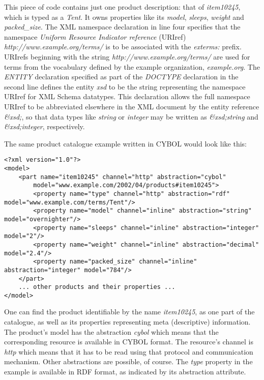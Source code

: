 This piece of code contains just one product description: that of
\emph{item10245}, which is typed as a \emph{Tent}. It owns properties like its
\emph{model}, \emph{sleeps}, \emph{weight} and \emph{packed\_size}. The XML
namespace declaration in line four specifies that the namespace
\emph{Uniform Resource Indicator reference} (URIref)
\emph{http://www.example.org/terms/} is to be associated with the
\emph{exterms:} prefix. URIrefs beginning with the string
\emph{http://www.example.org/terms/} are used for terms from the vocabulary
defined by the example organization, \emph{example.org}. The \emph{ENTITY}
declaration specified as part of the \emph{DOCTYPE} declaration in the second
line defines the entity \emph{xsd} to be the string representing the namespace
URIref for XML Schema datatypes. This declaration allows the full namespace
URIref to be abbreviated elsewhere in the XML document by the entity reference
\emph{\&xsd;}, so that data types like \emph{string} or \emph{integer} may be
written as \emph{\&xsd;string} and \emph{\&xsd;integer}, respectively.

The same product catalogue example written in CYBOL would look like this:

\begin{scriptsize}
    \begin{verbatim}
<?xml version="1.0"?>
<model>
    <part name="item10245" channel="http" abstraction="cybol"
        model="www.example.com/2002/04/products#item10245">
        <property name="type" channel="http" abstraction="rdf" model="www.example.com/terms/Tent"/>
        <property name="model" channel="inline" abstraction="string" model="overnighter"/>
        <property name="sleeps" channel="inline" abstraction="integer" model="2"/>
        <property name="weight" channel="inline" abstraction="decimal" model="2.4"/>
        <property name="packed_size" channel="inline" abstraction="integer" model="784"/>
    </part>
    ... other products and their properties ...
</model>
    \end{verbatim}
\end{scriptsize}

One can find the product identifiable by the name \emph{item10245}, as one part
of the catalogue, as well as its properties representing meta (descriptive)
information. The product's model has the abstraction \emph{cybol} which means
that the corresponding resource is available in CYBOL format. The resource's
channel is \emph{http} which means that it has to be read using that protocol
and communication mechanism. Other abstractions are possible, of course. The
\emph{type} property in the example is available in RDF format, as indicated by
its abstraction attribute.

